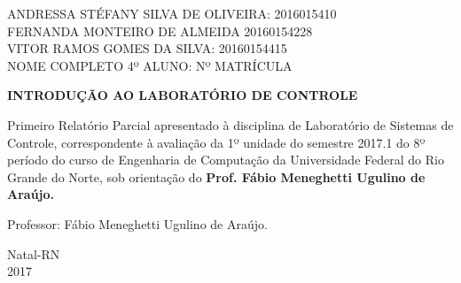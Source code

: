 \documentclass[a4paper,12pt]{article}
\begin{document}
\newpage


\thispagestyle{empty}

\begin{center}
\begin{normalsize}
ANDRESSA STÉFANY SILVA DE OLIVEIRA: 2016015410\\
\vspace{0.8cm}
FERNANDA MONTEIRO DE ALMEIDA 20160154228\\
\vspace{0.8cm}
VITOR RAMOS GOMES DA SILVA: 20160154415\\
\vspace{0.8cm}
NOME COMPLETO 4º ALUNO: Nº MATRÍCULA\\

\end{normalsize}
\end{center}
\vspace{3cm}

{\bf{\large {\centering INTRODUÇÃO AO LABORATÓRIO DE CONTROLE\\}}}

\vspace{4cm}

\begin{adjustwidth}{7.5cm}{0cm}

{\normalsize

Primeiro Relatório Parcial apresentado à disciplina de
Laboratório de Sistemas de Controle, correspondente à
avaliação da 1º unidade do semestre 2017.1 do 8º período
do curso de Engenharia de Computação da
Universidade Federal do Rio Grande do Norte, sob
orientação do {\bf Prof. Fábio Meneghetti Ugulino de
Araújo.}

}

\end{adjustwidth}

\vspace{2cm}

\begin{center}

Professor:  Fábio Meneghetti Ugulino de Araújo.

\vspace{2.5cm}

{\large Natal-RN\\
2017}

\end{center}

\newpage

\end{document}
